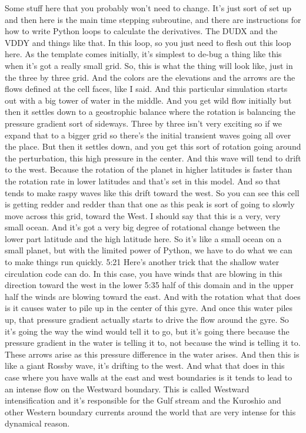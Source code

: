 {Some stuff here that you probably won't need to change. It's just sort of set up and then here is the main time stepping subroutine, and there are instructions for how to write Python loops to calculate the derivatives. The DUDX and the VDDY and things like that. In this loop, so you just need to flesh out this loop here. As the template comes initially, it's simplest to de-bug a thing like this when it's got a really small grid. So, this is what the thing will look like, just in the three by three grid. And the colors are the elevations and the arrows are the flows defined at the cell faces, like I said. And this particular simulation starts out with a big tower of water in the middle. And you get wild flow initially but then it settles down to a geostrophic balance where the rotation is balancing the pressure gradient sort of sideways. Three by three isn't very exciting so if we expand that to a bigger grid so there's the initial transient waves going all over the place. But then it settles down, and you get this sort of rotation going around the perturbation, this high pressure in the center. And this wave will tend to drift to the west. Because the rotation of the planet in higher latitudes is faster than the rotation rate in lower latitudes and that's set in this model. And so that tends to make raspy waves like this drift toward the west. So you can see this cell is getting redder and redder than that one as this peak is sort of going to slowly move across this grid, toward the West. I should say that this is a very, very small ocean. And it's got a very big degree of rotational change between the lower part latitude and the high latitude here. So it's like a small ocean on a small planet, but with the limited power of Python, we have to do what we can to make things run quickly. 
5:21
Here's another trick that the shallow water circulation code can do. In this case, you have winds that are blowing in this direction toward the west in the lower 
5:35
half of this domain and in the upper half the winds are blowing toward the east. And with the rotation what that does is it causes water to pile up in the center of this gyre. And once this water piles up, that pressure gradient actually starts to drive the flow around the gyre. So it's going the way the wind would tell it to go, but it's going there because the pressure gradient in the water is telling it to, not because the wind is telling it to. These arrows arise as this pressure difference in the water arises. And then this is like a giant Rossby wave, it's drifting to the west. And what that does in this case where you have walls at the east and west boundaries is it tends to lead to an intense flow on the Westward boundary. This is called Westward intensification and it's responsible for the Gulf stream and the Kuroshio and other Western boundary currents around the world that are very intense for this dynamical reason. 

}
